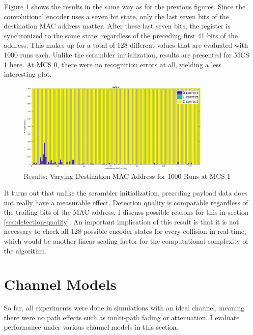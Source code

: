 Figure \ref{fig:vary_dest} shows the results in the same way as for the previous figures. Since the convolutional encoder uses a seven bit state, only the last seven bits of the destination \gls{MAC} address matter. After these last seven bits, the register is synchronized to the same state, regardless of the preceding first 41 bits of the address. This makes up for a total of 128 different values that are evaluated with 1000 runs each. Unlike the scrambler initialization, results are presented for \gls{MCS} 1 here. At \gls{MCS} 0, there were no recognition errors at all, yielding a less interesting plot.

\begin{figure}[H]
	\centering
	\includegraphics[height=4.5cm]{gfx/plots/destination}
	\caption[Results: Varying Destination MAC Address for 1000 Runs]{Results: Varying Destination MAC Address for 1000 Runs at MCS 1}
	\label{fig:vary_dest}
\end{figure}

It turns out that unlike the scrambler initialization, preceding payload data does not really have a measurable effect. Detection quality is comparable regardless of the trailing bits of the \gls{MAC} address. I discuss possible reasons for this in section \ref{sec:detection-quality}. An important implication of this result is that it is not necessary to check all 128 possible encoder states for every collision in real-time, which would be another linear scaling factor for the computational complexity of the algorithm.



\section{Channel Models}

So far, all experiments were done in simulations with an ideal channel, meaning there were no path effects such as multi-path fading or attenuation. I evaluate performance under various channel models in this section.\\

